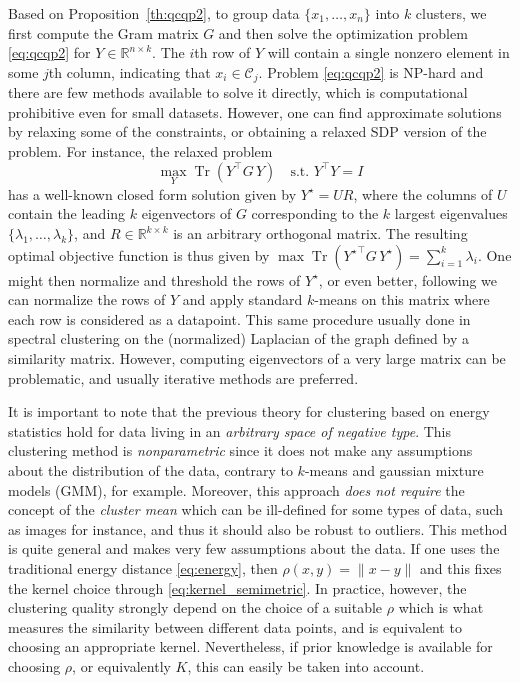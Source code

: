 \documentclass[aps,preprint,nofootinbib,floatfix]{revtex4-1}
\DeclareMathOperator{\Tr}{Tr}
\newcommand\C{{\mathcal{C}}}
\newcommand\Zt{Y}
\begin{document}
Based on Proposition~\ref{th:qcqp2}, to group data $\{ x_1,\dotsc,x_n \}$
into  $k$ clusters, we first compute the Gram matrix
$G$ and then 
solve the optimization problem \eqref{eq:qcqp2} for $\Zt \in
\mathbb{R}^{n\times k}$. The $i$th row
of $\Zt$ will contain a single nonzero element in some $j$th column,
indicating that $x_i \in \C_j$. 
Problem \eqref{eq:qcqp2} is NP-hard and there
are few methods
available to solve it directly,
which is computational prohibitive even for small datasets.
However, one can find approximate solutions by relaxing some 
of the constraints, or obtaining a relaxed SDP version of the problem. 
For instance, the relaxed problem
\begin{equation}
\max_{Y} \Tr \left( Y^\top G \, Y \right) \quad \mbox{s.t. $Y^\top Y = I$}
\end{equation}
has a well-known closed form solution given by $Y^\star = U R$, where the
columns of $U$ contain the leading $k$ eigenvectors of $G$ corresponding
to the $k$ largest eigenvalues $\{ \lambda_1,\dotsc,\lambda_k \}$, and
$R \in \mathbb{R}^{k\times k}$ is an arbitrary orthogonal matrix. 
The resulting
optimal objective function is thus given by
$\max \Tr \left( {Y^\star}^\top G \, Y^\star \right)  = 
\sum_{i=1}^k \lambda_i$. One might then normalize and threshold the rows
of $Y^\star$, or even better, following \cite{NgJordan} we can normalize the
rows of $Y$ and apply standard $k$-means on this matrix where each
row is considered as a datapoint.
This same 
procedure usually done in spectral clustering on the (normalized) Laplacian
of the graph defined by a similarity matrix.
However, computing eigenvectors of a very large matrix
can be problematic, and usually iterative methods are preferred.

It is important to note 
that the previous theory for clustering based on energy statistics
hold for data living in an \emph{arbitrary space of negative type}.
This clustering method is
\emph{nonparametric} since it does not make any assumptions
about 
the distribution of the data,
contrary to $k$-means and gaussian mixture models (GMM), for example.
Moreover, this approach \emph{does not require} the concept of the 
\emph{cluster mean}
which can be ill-defined for some types of data, such as images for
instance, and thus it should also be robust to outliers.
This method is quite general and makes very few
assumptions about the data. If one uses the traditional energy distance
\eqref{eq:energy}, then $\rho(x,y) = \| x - y\|$ and this fixes the kernel
choice through \eqref{eq:kernel_semimetric}.
In practice, however,
the clustering quality strongly depend on the choice of a suitable
$\rho$ which is what measures the similarity between different data points,
and is equivalent to choosing an appropriate kernel.
Nevertheless, if prior knowledge is available for choosing $\rho$, 
or equivalently $K$,
this can easily be taken into account.
\end{document}
